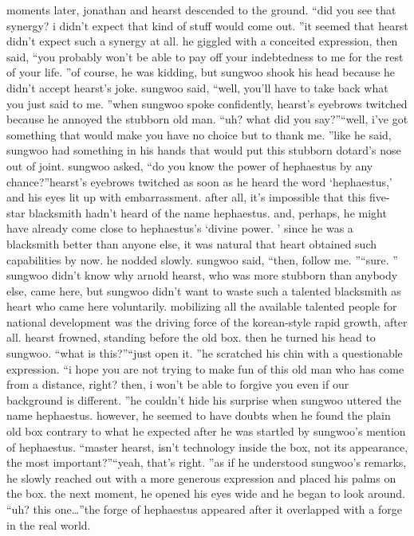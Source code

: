 moments later, jonathan and hearst descended to the ground.
“did you see that synergy? i didn’t expect that kind of stuff would come out.
”it seemed that hearst didn’t expect such a synergy at all.
 he giggled with a conceited expression, then said, “you probably won’t be able to pay off your indebtedness to me for the rest of your life.
”of course, he was kidding, but sungwoo shook his head because he didn’t accept hearst’s joke.
sungwoo said, “well, you’ll have to take back what you just said to me.
”when sungwoo spoke confidently, hearst’s eyebrows twitched because he annoyed the stubborn old man.
“uh? what did you say?”“well, i’ve got something that would make you have no choice but to thank me.
”like he said, sungwoo had something in his hands that would put this stubborn dotard’s nose out of joint.
sungwoo asked, “do you know the power of hephaestus by any chance?”hearst’s eyebrows twitched as soon as he heard the word ‘hephaestus,’ and his eyes lit up with embarrassment.
after all, it’s impossible that this five-star blacksmith hadn’t heard of the name hephaestus.
and, perhaps, he might have already come close to hephaestus’s ‘divine power.
’ since he was a blacksmith better than anyone else, it was natural that heart obtained such capabilities by now.
 he nodded slowly.
sungwoo said, “then, follow me.
”“sure.
”
sungwoo didn’t know why arnold hearst, who was more stubborn than anybody else, came here, but sungwoo didn’t want to waste such a talented blacksmith as heart who came here voluntarily.
 mobilizing all the available talented people for national development was the driving force of the korean-style rapid growth, after all.
hearst frowned, standing before the old box.
 then he turned his head to sungwoo.
“what is this?”“just open it.
”he scratched his chin with a questionable expression.
“i hope you are not trying to make fun of this old man who has come from a distance, right? then, i won’t be able to forgive you even if our background is different.
”he couldn’t hide his surprise when sungwoo uttered the name hephaestus.
however, he seemed to have doubts when he found the plain old box contrary to what he expected after he was startled by sungwoo’s mention of hephaestus.
“master hearst, isn’t technology inside the box, not its appearance, the most important?”“yeah, that’s right.
”as if he understood sungwoo’s remarks, he slowly reached out with a more generous expression and placed his palms on the box.
the next moment, he opened his eyes wide and he began to look around.
“uh? this one…”the forge of hephaestus appeared after it overlapped with a forge in the real world.
